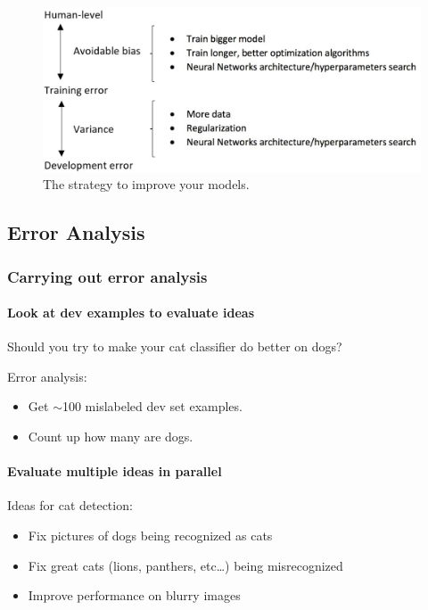 \documentclass[UTF8]{article}
\begin{document}
\begin{figure}[htb]
    \centering
    \includegraphics[width=40em]{figures/improve-model}
    \caption{The strategy to improve your models.}
    \label{fig:improve-model}
\end{figure}

\subsection{Error Analysis}
\subsubsection{Carrying out error analysis}
\paragraph{Look at dev examples to evaluate ideas}
Should you try to make your cat classifier do better on
dogs?

Error analysis:
\begin{itemize}
    \item Get $\sim$100 mislabeled dev set examples.
    \item Count up how many are dogs.
\end{itemize}

\paragraph{Evaluate multiple ideas in parallel}
Ideas for cat detection:
\begin{itemize}
    \item Fix pictures of dogs being recognized as cats
    \item Fix great cats (lions, panthers, etc\ldots) being misrecognized
    \item Improve performance on blurry images
\end{itemize}
\end{document}
